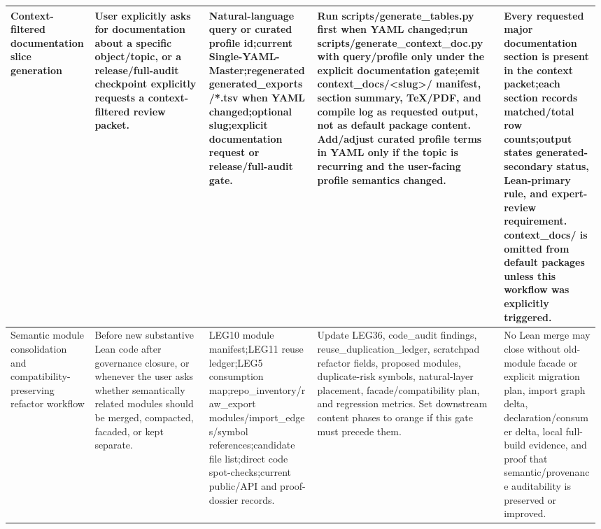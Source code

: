 \begin{longtable}{L{0.14\linewidth} L{0.19\linewidth} L{0.18\linewidth} L{0.31\linewidth} L{0.16\linewidth}}
Context-filtered documentation slice generation & User explicitly asks for documentation about a specific object/\allowbreak{}topic, or a release/\allowbreak{}full-audit checkpoint explicitly requests a context-filtered review packet. & Natural-language query or curated profile id;\newline current Single-YAML-Master;\newline regenerated generated\_exports/\allowbreak{}*.tsv when YAML changed;\newline optional slug;\newline explicit documentation request or release/\allowbreak{}full-audit gate. & Run scripts/\allowbreak{}generate\_tables.py first when YAML changed;\newline run scripts/\allowbreak{}generate\_context\_doc.py with query/\allowbreak{}profile only under the explicit documentation gate;\newline emit context\_docs/\allowbreak{}<slug>/\allowbreak{} manifest, section summary, TeX/\allowbreak{}PDF, and compile log as requested output, not as default package content. Add/\allowbreak{}adjust curated profile terms in YAML only if the topic is recurring and the user-facing profile semantics changed. & Every requested major documentation section is present in the context packet;\newline each section records matched/\allowbreak{}total row counts;\newline output states generated-secondary status, Lean-primary rule, and expert-review requirement. context\_docs/\allowbreak{} is omitted from default packages unless this workflow was explicitly triggered.\\
\hline
\addlinespace[0.24em]
Semantic module consolidation and compatibility-preserving refactor workflow & Before new substantive Lean code after governance closure, or whenever the user asks whether semantically related modules should be merged, compacted, facaded, or kept separate. & LEG10 module manifest;\newline LEG11 reuse ledger;\newline LEG5 consumption map;\newline repo\_inventory/\allowbreak{}raw\_export modules/\allowbreak{}import\_edges/\allowbreak{}symbol references;\newline candidate file list;\newline direct code spot-checks;\newline current public/\allowbreak{}API and proof-dossier records. & Update LEG36, code\_audit findings, reuse\_duplication\_ledger, scratchpad refactor fields, proposed modules, duplicate-risk symbols, natural-layer placement, facade/\allowbreak{}compatibility plan, and regression metrics. Set downstream content phases to orange if this gate must precede them. & No Lean merge may close without old-module facade or explicit migration plan, import graph delta, declaration/\allowbreak{}consumer delta, local full-build evidence, and proof that semantic/\allowbreak{}provenance auditability is preserved or improved.\\

\end{longtable}
